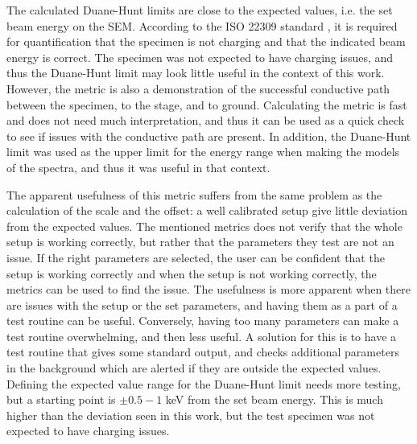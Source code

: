 The calculated Duane-Hunt limits are close to the expected values, i.e. the set beam energy on the SEM.
According to the ISO 22309 standard \cite{iso_quantification_22309}, it is required for quantification that the specimen is not charging and that the indicated beam energy is correct.
The specimen was not expected to have charging issues, and thus the Duane-Hunt limit may look little useful in the context of this work.
However, the metric is also a demonstration of the successful conductive path between the specimen, to the stage, and to ground.
Calculating the metric is fast and does not need much interpretation, and thus it can be used as a quick check to see if issues with the conductive path are present.
In addition, the Duane-Hunt limit was used as the upper limit for the energy range when making the models of the spectra, and thus it was useful in that context.

The apparent usefulness of this metric suffers from the same problem as the calculation of the scale and the offset: a well calibrated setup give little deviation from the expected values.
The mentioned metrics does not verify that the whole setup is working correctly, but rather that the parameters they test are not an issue.
If the right parameters are selected, the user can be confident that the setup is working correctly and when the setup is not working correctly, the metrics can be used to find the issue.
The usefulness is more apparent when there are issues with the setup or the set parameters, and having them as a part of a test routine can be useful.
Conversely, having too many parameters can make a test routine overwhelming, and then less useful.
A solution for this is to have a test routine that gives some standard output, and checks additional parameters in the background which are alerted if they are outside the expected values.
Defining the expected value range for the Duane-Hunt limit needs more testing, but a starting point is $\pm 0.5-1$ keV from the set beam energy.
This is much higher than the deviation seen in this work, but the test specimen was not expected to have charging issues.




